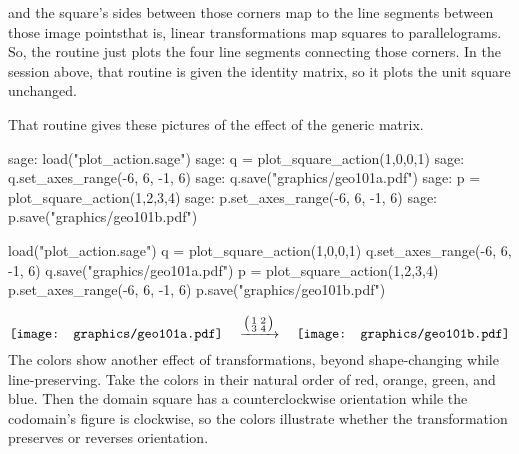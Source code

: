 and the square's sides between those corners map to the line segments between
those image points\Dash that is, linear transformations map squares to
parallelograms.
So, the routine just plots the four line segments connecting those corners.
In the \Sage{} session above, that routine is given the identity matrix,
so it plots the unit square unchanged.

That routine gives
these pictures of the effect of the generic matrix.
\begin{sagecommandline}
sage: load("plot_action.sage")
sage: q = plot_square_action(1,0,0,1) 
sage: q.set_axes_range(-6, 6, -1, 6) 
sage: q.save("graphics/geo101a.pdf")
sage: p = plot_square_action(1,2,3,4) 
sage: p.set_axes_range(-6, 6, -1, 6) 
sage: p.save("graphics/geo101b.pdf")
\end{sagecommandline}
\begin{sagesilent}
load("plot_action.sage")
q = plot_square_action(1,0,0,1) 
q.set_axes_range(-6, 6, -1, 6) 
q.save("graphics/geo101a.pdf")
p = plot_square_action(1,2,3,4) 
p.set_axes_range(-6, 6, -1, 6) 
p.save("graphics/geo101b.pdf")
\end{sagesilent}
\begin{equation*}
  \vcenteredhbox{\texttt{[image: graphics/geo101a.pdf]}}
  \quad\mapsvia{\big (\begin{smallmatrix} 1 &2 \\ 3 &4 \end{smallmatrix}\big )}\quad
  \vcenteredhbox{\texttt{[image: graphics/geo101b.pdf]}}
\end{equation*}
The colors show another effect of transformations, beyond shape-changing
while line-preserving.
Take the colors in their natural order of red, orange, 
green, and blue.
Then the domain square has a counterclockwise orientation while the codomain's
figure is clockwise, so the colors illustrate whether the transformation 
preserves or reverses orientation.

